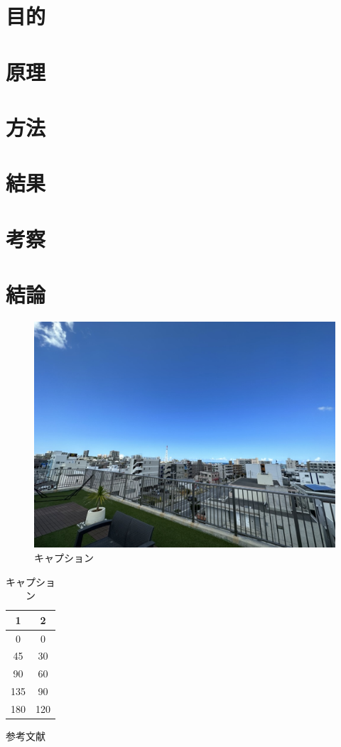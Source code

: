 \documentclass[a4paper,11pt]{jsarticle}
\title{}
\date{\today}
\author{\\
学籍番号:1111\\
氏名:桃太郎}
\begin{document}
\maketitle

\newpage

\section{目的}
\section{原理}
\section{方法}
\section{結果}
\section{考察}
\section{結論}


\begin{figure}[H]
  \centering
  \includegraphics[width=14cm]{Introduce.jpeg}
  \caption{キャプション} 
\end{figure}


\begin{table}[H]
  \begin{center}
  \caption{キャプション}
  \begin{tabular}{cc} \hline
  1 &   2 \\ \hline
  0   & 0  \\
  45  & 30  \\
  90  & 60  \\
  135 & 90  \\
  180 & 120  \\
  \hline
\end{tabular}
\end{center}
\end{table}

\begin{thebibliography}{99}
    参考文献
\end{thebibliography}
  
\end{document}
